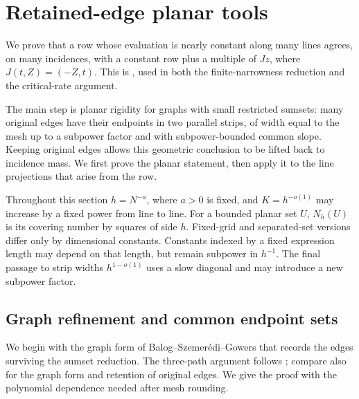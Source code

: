\section{Retained-edge planar tools}\label{sec:retained-edge-tools}

We prove that a row whose evaluation is nearly constant along many
lines agrees, on many incidences, with a constant row plus a multiple
of \(Jz\), where \(J(t,Z)=(-Z,t)\).  This is
, used in both the finite-narrowness reduction and
the critical-rate argument.

The main step is planar rigidity for graphs with small restricted
sumsets: many original edges have their endpoints in two parallel
strips, of width equal to the mesh up to a subpower factor and with
subpower-bounded common slope.  Keeping original edges allows this
geometric conclusion to be lifted back to incidence mass.  We first
prove the planar statement, then apply it to the line projections
that arise from the row.

Throughout this section \(h=N^{-a}\), where \(a>0\) is fixed, and
\(K=h^{-o(1)}\) may increase by a fixed power from line to line.
For a bounded planar set \(U\), \(N_h(U)\) is its covering number by
squares of side \(h\).  Fixed-grid and separated-set versions differ
only by dimensional constants.  Constants indexed by a fixed
expression length may depend on that length, but remain subpower in
\(h^{-1}\).  The final passage to strip widths \(h^{1-o(1)}\) uses
a slow diagonal and may introduce a new subpower factor.

\subsection{Graph refinement and common endpoint sets}

We begin with the graph form of Balog--Szemer\'edi--Gowers that records
the edges surviving the sumset reduction. The three-path argument
follows \citet[Lemma~4.2 and the proof of Theorem~4.1]{SudakovSzemerediVu2005}; compare also
\citet[Theorem~2.29 and Exercise~6.4.10]{TaoVu2006} for the graph
form and retention of original edges. We give the proof with the
polynomial dependence needed after mesh rounding.

